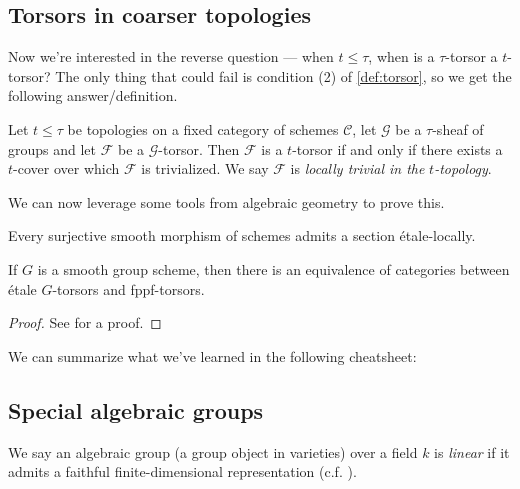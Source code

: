 \documentclass[11pt,openany]{book}
\begin{document}
\subsection{Torsors in coarser topologies}

Now we're interested in the reverse question --- when $t\le \tau$, when is a $\tau$-torsor a $t$-torsor? The only thing that could fail is condition (2) of \autoref{def:torsor}, so we get the following answer/definition.


\begin{definition} Let $t\le \tau$ be topologies on a fixed category of schemes $\mathscr{C}$, let $\mathcal{G}$ be a $\tau$-sheaf of groups and let $\mathcal{F}$ be a $\mathcal{G}$-torsor. Then $\mathcal{F}$ is a $t$-torsor if and only if there exists a $t$-cover over which $\mathcal{F}$ is trivialized. We say $\mathcal{F}$ is \textit{locally trivial in the} $t$\textit{-topology}.
\end{definition}

We can now leverage some tools from algebraic geometry to prove this.

\begin{proposition} Every surjective smooth morphism of schemes admits a section \'etale-locally.
\end{proposition}

\begin{corollary} If $G$ is a smooth group scheme, then there is an equivalence of categories between \'etale $G$-torsors and fppf-torsors.
\end{corollary}
\begin{proof} See \cite[Proposition~4]{chd} for a proof.
\end{proof}

We can summarize what we've learned in the following cheatsheet:





\subsection{Special algebraic groups}


\begin{definition} We say an algebraic group (a group object in varieties) over a field $k$ is \textit{linear} if it admits a faithful finite-dimensional representation (c.f. \cite[p.~72]{MilneAG}).
\end{definition}
\end{document}
